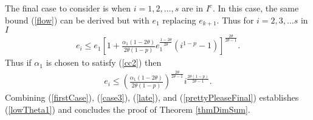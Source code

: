 \begin{comment}
Now since $k+1\in I^c$, 
\begin{eqnarray*}
e_{k+1}\geq 
\left(
\frac{\alpha_{k+1} G^2}{c}
\right)^{\frac{1}{\gamma}}
=
\left(
\frac{\alpha_1 G^2}{c}
\right)^{2\theta}
(k+1)^{-2d\theta}.
\end{eqnarray*}
Combining this with (\ref{case33}) and plugging into (\ref{late}) yields
\begin{eqnarray}
e_{k+i}&\leq& C_1(k+1)^{-2d\theta}
\left[\frac{1}{2}+C_2(k+1)^{-d(1-2\theta)}
(k+i)^{1-d}
\right]^{\frac{2\theta}{2\theta-1}}
\nonumber\\\nonumber
&=&
C_1
\left[\frac{1}{2}(k+1)^{d(1-2\theta)}+C_2
(k+i)^{1-d}
\right]^{\frac{2\theta}{2\theta-1}}
\\\label{NewCase}
&\leq&
C_1
\left[\frac{1}{2}+C_2
(k+i)^{1-d}
\right]^{\frac{2\theta}{2\theta-1}}
\end{eqnarray}
where
\begin{eqnarray*}
C_2=\left(
\frac{G^2}{c}
\right)^{2\theta}\frac{\alpha_1^{2(1-\theta)}(1-2\theta)}{2\theta(1-d)}
\end{eqnarray*}
\end{comment}
The final case to consider is when $i=1,2,\ldots,s$ are in $I^c$. In this case, the same bound (\ref{flow}) can be derived but with $e_{1}$ replacing $e_{k+1}$. Thus for $i=2,3,\ldots s$ in $I$
\begin{eqnarray}
e_{i}
\leq
e_1
\left[1+\frac{\alpha_1(1-2\theta)}{2\theta(1-p)}e_{1}^{\frac{1-2\theta}{2\theta}}
\left(
i^{1-p}-1
\right)
\right]^{\frac{2\theta}{2\theta-1}}\label{firstI}.
\end{eqnarray}
Thus if $\alpha_1$ is chosen to satisfy (\ref{cc2}) then
\begin{eqnarray}
e_{i}\label{prettyPleaseFinal}
\leq
\left(\frac{\alpha_1(1-2\theta)}{2\theta(1-p)}\right)^{\frac{2\theta}{2\theta-1}}
i^{\frac{2\theta(1-p)}{2\theta-1}}.
\end{eqnarray} 
Combining (\ref{firstCase}), (\ref{case3}), (\ref{late}), and (\ref{prettyPleaseFinal}) establishes (\ref{lowTheta1}) and concludes the proof of Theorem \ref{thmDimSum}.
